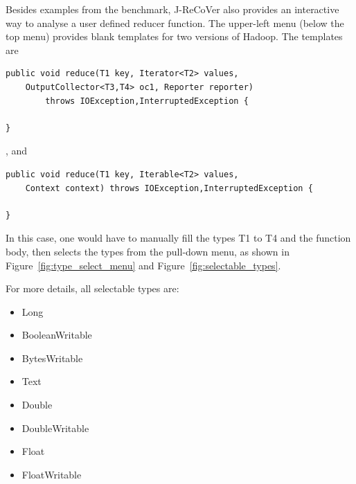 Besides examples from the benchmark, J-ReCoVer also provides an interactive way to analyse a user defined reducer function.
The upper-left menu (below the top menu) provides blank templates for two versions of Hadoop. The templates are

\begin{mdframed}[roundcorner=5pt]
\begin{verbatim}
public void reduce(T1 key, Iterator<T2> values,
	OutputCollector<T3,T4> oc1, Reporter reporter)
		throws IOException,InterruptedException {

}
\end{verbatim}
\end{mdframed}

, and

\begin{mdframed}[roundcorner=5pt]
\begin{verbatim}
public void reduce(T1 key, Iterable<T2> values,
	Context context) throws IOException,InterruptedException {

}
\end{verbatim}
\end{mdframed}

In this case, one would have to manually fill the types T1 to T4 and the function body, then selects the types from the pull-down menu, as shown in Figure~\ref{fig:type_select_menu} and Figure~\ref{fig:selectable_types}.

For more details, all selectable types are:

\begin{itemize}
\item Long
\item BooleanWritable
\item BytesWritable
\item Text
\item Double
\item DoubleWritable
\item Float
\item FloatWritable
\end{itemize}
